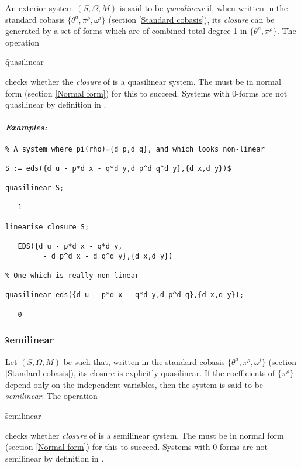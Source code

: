 \hypertarget{operator:QUASILINEAR}{}
An exterior system $(S,\Omega,M)$ is said to be \emph{quasilinear} if, when
written in the standard cobasis $\{\theta^a,\pi^\rho,\omega^i\}$ (section
\ref{Standard cobasis}), its \emph{closure} can be generated by a set of
forms which are of combined total degree 1 in $\{\theta^a,\pi^\rho\}$. The
operation
\begin{syntax}
	\f{quasilinear} 
\end{syntax}
checks whether the \emph{closure} of  is a quasilinear system. The
 must be in normal form (section \ref{Normal form}) for this to
succeed. Systems with 0-forms are not quasilinear by definition in .

\paragraph{\textit{Examples:}}
\begin{verbatim}
% A system where pi(rho)={d p,d q}, and which looks non-linear

S := eds({d u - p*d x - q*d y,d p^d q^d y},{d x,d y})$

quasilinear S;

   1

linearise closure S;

   EDS({d u - p*d x - q*d y,
         - d p^d x - d q^d y},{d x,d y})

% One which is really non-linear

quasilinear eds({d u - p*d x - q*d y,d p^d q},{d x,d y});

   0
\end{verbatim}

\subsubsection{\f{semilinear}}
\label{semilinear}

\hypertarget{operator:SEMILINEAR}{}
Let $(S,\Omega,M)$ be such that, written in the standard cobasis
$\{\theta^a,\pi^\rho,\omega^i\}$ (section \ref{Standard cobasis}), its
closure is explicitly quasilinear. If the coefficients of $\{\pi^\rho\}$
depend only on the independent variables, then the system is said to be
\emph{semilinear}.  The operation
\begin{syntax}
	\f{semilinear} 
\end{syntax}
checks whether \emph{closure} of  is a semilinear system. The
 must be in normal form (section \ref{Normal form}) for this to
succeed. Systems with 0-forms are not semilinear by definition in .

